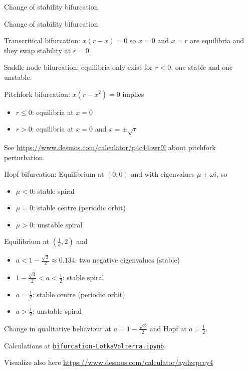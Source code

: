 \documentclass{workbook}
\begin{document}
\begin{solution}
\begin{slide}
\begin{parts}
	\item Change of stability bifurcation
	\item Change of stability bifurcation
	\item Transcritical bifurcation: $x(r-x) = 0$ so $x=0$ and $x=r$ are equilibria and they swap stability at $r=0$.
	\item Saddle-node bifurcation: equilibria only exist for $r<0$, one stable and one unstable.
	\item Pitchfork bifurcation: $x(r-x^2)=0$ implies
	\begin{itemize}
		\item $r\leq 0$: equilibria at $x=0$
		\item $r>0$: equilibria at $x=0$ and $x=\pm \sqrt{r}$
	\end{itemize}
	See \url{https://www.desmos.com/calculator/p4c44owr9l} about pitchfork perturbation.
	\item Hopf bifurcation: Equilibrium at $(0,0)$ and with eigenvalues $\mu \pm \omega i$, so
	\begin{itemize}
		\item $\mu<0$: stable spiral
		\item $\mu = 0$: stable centre (periodic orbit)
		\item $\mu > 0$: unstable spiral
	\end{itemize}
	\item Equilibrium at $(\frac{1}{a},2)$ and
	\begin{itemize}
		\item $a < 1-\frac{\sqrt{3}}{2} \approx 0.134$: two negative eigenvalues (stable)
		\item $1-\frac{\sqrt{3}}{2}< a < \frac12$: stable spiral
		\item $ a = \frac12$: stable centre (periodic orbit)
		\item $ a > \frac12$: unstable spiral
	\end{itemize}
	
	Change in qualitative behaviour at $a = 1-\frac{\sqrt{3}}{2}$ and Hopf at $a = \frac12$.
	
	Calculations at \href{https://utoronto.syzygy.ca/jupyter/user-redirect/git-pull?repo=https://github.com/bigfatbernie/IBLMathModeling&subPath=python/bifurcation-LotkaVolterra.ipynb}{\tt bifurcation-LotkaVolterra.ipynb}.
	
	Visualize also here \url{https://www.desmos.com/calculator/aydzcpccy4}

\end{parts}
	
\end{slide}
	
\end{solution}
\end{document}
